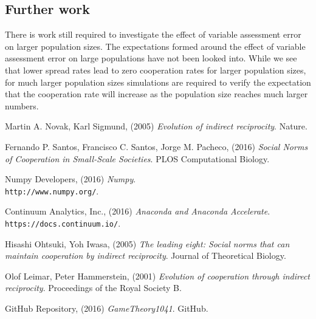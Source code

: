 \documentclass[10pt,a4paper]{article}
\begin{document}
\subsection{Further work}
There is work still required to investigate the effect of variable assessment error on larger population sizes.
The expectations formed around the effect of variable assessment error on large populations have not been looked into.
While we see that lower spread rates lead to zero cooperation rates for larger population sizes, for much larger population sizes simulations are required to verify the expectation that the cooperation rate will increase as the population size reaches much larger numbers.

\pagebreak
\begin{thebibliography}{9}

Martin A. Novak, Karl Sigmund, (2005) 
\textit{Evolution of indirect reciprocity}. 
Nature.

Fernando P. Santos, Francisco C. Santos, Jorge M. Pacheco, (2016) 
\textit{Social Norms of Cooperation in Small-Scale Societies}. 
PLOS Computational Biology.

Numpy Developers, (2016) 
\textit{Numpy}. 
\\\texttt{http://www.numpy.org/}.

Continuum Analytics, Inc., (2016) 
\textit{Anaconda and Anaconda Accelerate}. 
\\\texttt{https://docs.continuum.io/}.

Hisashi Ohtsuki, Yoh Iwasa, (2005) 
\textit{The leading eight: Social norms that can maintain cooperation by indirect reciprocity}. 
Journal of Theoretical Biology.

Olof Leimar, Peter Hammerstein, (2001) 
\textit{Evolution of cooperation through indirect reciprocity}. 
Proceedings of the Royal Society B.

GitHub Repository, (2016) 
\textit{GameTheory1041}. GitHub.

\end{thebibliography}
\end{document}
